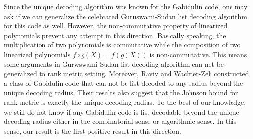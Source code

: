 \documentclass[11pt]{article}
\theoremstyle{plain}
\theoremstyle{definition}
\theoremstyle{remark}
\begin{document}
Since the unique decoding algorithm was known for the Gabidulin code, one may ask if we can generalize the celebrated Guruswami-Sudan list decoding algorithm for this code as well. However, the non-commutative property of linearized polynomials prevent any attempt in this direction. 
Basically speaking, the multiplication of two polynomials is commutative while the composition of two linearized polynomials $f\circ g(X)=f(g(X))$ is non-commutative. This means some arguments in Gurwswami-Sudan list decoding algorithm can not be generalized to rank metric setting. Moreover, Raviv and Wachter-Zeh \cite{raviv2016some,raviv2017correction} 
constructed a class of Gabidulin code that can not be list decoded to any radius beyond the unique decoding radius. Their results also suggest that the Johnson bound for rank metric is exactly the unique decoding radius. To the best of our knowledge, we still do not know if any Gabidulin code is list decodable beyond the unique decoding radius either in the combinatorial sense or algorithmic sense. In this sense, our result is the first positive result in this direction.
\end{document}
